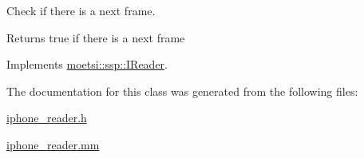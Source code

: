 Check if there is a next frame. 

\begin{DoxyReturn}{Returns}
true if there is a next frame 
\end{DoxyReturn}


Implements \hyperlink{classmoetsi_1_1ssp_1_1IReader_af9186ba41e136dc4ec3242b5dd55fa04}{moetsi\+::ssp\+::\+I\+Reader}.



The documentation for this class was generated from the following files\+:\begin{DoxyCompactItemize}
\item 
\hyperlink{iphone__reader_8h}{iphone\+\_\+reader.\+h}\item 
\hyperlink{iphone__reader_8mm}{iphone\+\_\+reader.\+mm}\end{DoxyCompactItemize}
